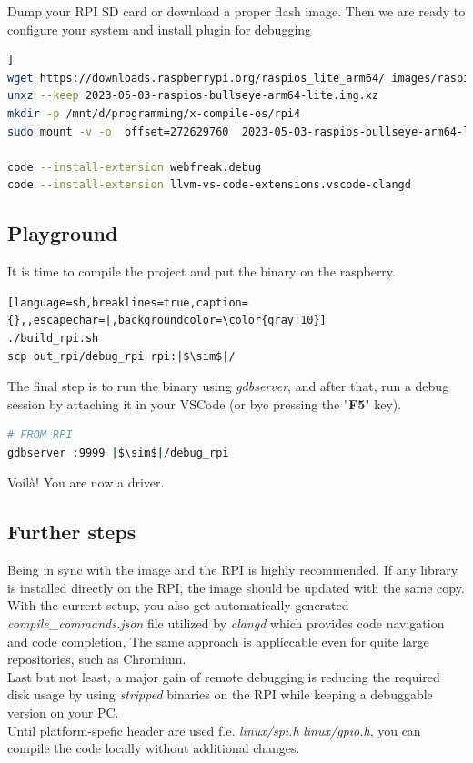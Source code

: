 \documentclass[twocolumn, 10pt]{article}
\begin{document}
Dump your RPI SD card or download a proper flash image\cite{bib:rpi_images}.
Then we are ready to configure your system and install plugin for debugging

\begin{lstlisting}[language=sh,backgroundcolor=\color{gray!10},breaklines=true,escapechar=|,caption={}]]
wget https://downloads.raspberrypi.org/raspios_lite_arm64/ images/raspios_lite_arm64-2023-05-03/ 2023-05-03-raspios-bullseye-arm64-lite.img.xz
unxz --keep 2023-05-03-raspios-bullseye-arm64-lite.img.xz
mkdir -p /mnt/d/programming/x-compile-os/rpi4
sudo mount -v -o  offset=272629760  2023-05-03-raspios-bullseye-arm64-lite.img /mnt/d/programming/x-compile-os/rpi4

code --install-extension webfreak.debug 
code --install-extension llvm-vs-code-extensions.vscode-clangd
\end{lstlisting}


\subsection*{Playground}
It is time to compile the project and put the binary on the raspberry.
\begin{lstlisting}[language=sh,breaklines=true,caption={},,escapechar=|,backgroundcolor=\color{gray!10}]
./build_rpi.sh
scp out_rpi/debug_rpi rpi:|$\sim$|/ 
\end{lstlisting}

The final step is to run the binary using \textit{gdbserver}, and after that, run a debug session by attaching it in your VSCode (or bye pressing the "\textbf{F5}" key).
\begin{lstlisting}[language=sh,breaklines=true,caption={},escapechar=|,backgroundcolor=\color{gray!10}]
# FROM RPI 
gdbserver :9999 |$\sim$|/debug_rpi
\end{lstlisting}
Voilà! You are now a driver.

\subsection*{Further steps}
Being in sync with the image and the RPI is highly recommended.
  If any library is installed directly on the RPI, the image
  should be updated with the same copy.
\\
With the current setup, you also get automatically generated \textit
  {compile\_commands.json} file utilized by \textit{clangd}
  \cite{bib:clangd} which provides code navigation and code completion, The same approach is appliccable even for quite large repositories,
  such as Chromium.
\\
Last but not least, a major gain of remote debugging is reducing
  the required disk usage by using \textit{stripped} binaries on the RPI while keeping a debuggable version on your PC.
\\
Until platform-spefic header are used f.e. \textit{linux/spi.h} 
  \textit{linux/gpio.h}, you can compile the code locally without additional changes.
\end{document}
